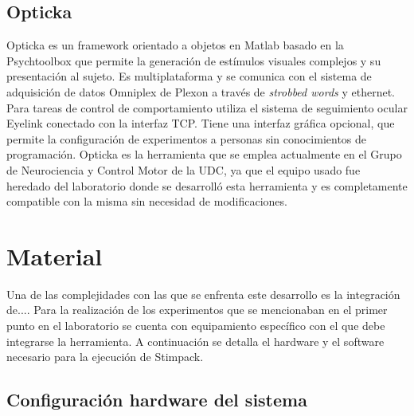 \documentclass[conference]{IEEEtran}
\begin{document}
\subsection{Opticka}

Opticka\cite{opticka} es un framework orientado a objetos en Matlab basado en la Psychtoolbox que permite la generación de estímulos visuales complejos y su presentación al sujeto. Es multiplataforma y se comunica con el sistema de adquisición de datos Omniplex\cite{omniplex} de Plexon a través de \textit{strobbed words} y ethernet. Para tareas de control de comportamiento utiliza el sistema de seguimiento ocular Eyelink conectado con la interfaz TCP. 
Tiene una interfaz gráfica opcional, que permite la configuración de experimentos a personas sin conocimientos de programación.
Opticka es la herramienta que se emplea actualmente en el Grupo de Neurociencia y Control Motor de la UDC, ya que el equipo usado fue heredado del laboratorio donde se desarrolló esta herramienta y es completamente compatible con la misma sin necesidad de modificaciones.







\section{Material}

Una de las complejidades con las que se enfrenta este desarrollo es la integración de....
Para la realización de los experimentos que se mencionaban en el primer punto en el laboratorio se cuenta con equipamiento específico con el que debe integrarse la herramienta. A continuación se detalla el hardware y el software necesario para la ejecución de Stimpack.

\subsection{Configuración hardware del sistema}
\end{document}
